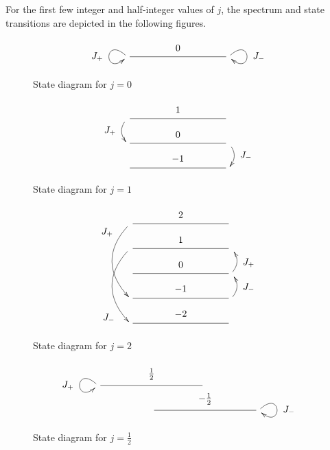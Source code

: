 For the first few integer and half-integer values of $j$, the spectrum
and state transitions are depicted in the following figures.
\begin{figure}[!h]
  \[
  \xymatrix@R=20pt@C=100pt{
    \ar@(ul,dl)[]_*+{J_+} \ar@{-}[r]^-*+{0} & \ar@(ur,dr)[]^*+{J_-}
  }
  \]
  \caption{State diagram for $j=0$}
  \label{J0Diagram}
\end{figure}
\begin{figure}[!h]
  \[
  \xymatrix@R=20pt@C=100pt{
    \ar@/_/[d]_*+{J_+} \ar@{-}[r]^-*+{1} & \\
    \ar@{-}[r]^-*+{0} & \ar@/^/[d]^*+{J_-} \\
    \ar@{-}[r]^-*+{-1} &  \\
  }
  \]
  \caption{State diagram for $j=1$}
  \label{J1Diagram}
\end{figure}
\begin{figure}[!h]
  \[
  \xymatrix@R=20pt@C=100pt{
    \ar@(dl,ul)[ddd]_<<<<<*+{J_+} \ar@{-}[r]^-*+{2} & \\
    \ar@(dl,ul)[ddd]_>>>>>*+{J_-} \ar@{-}[r]^-*+{1} & \\
    \ar@{-}[r]^-*+{0} & \ar@/_/[u]_-*+{J_+} \\
    \ar@{-}[r]^-*+{-1} & \ar@/_/[u]_-*+{J_-} \\
    \ar@{-}[r]^-*+{-2} &
  }
  \]
  \caption{State diagram for $j=2$}
  \label{J2Diagram}
\end{figure}
\pagebreak
\begin{figure}[!h]
  \[
  \xymatrix@R=20pt@C=50pt{
    \ar@(ul,dl)[]_*+{J_+} \ar@{-}[rr]^-*+{\frac12} & & \\
                                                  & \ar@{-}[rr]^-*+{-\frac12} & & \ar@(ur,dr)[]^*+{J_-} \\
  }
  \]
  \caption{State diagram for $j=\frac12$}
  \label{J1/2Diagram}
\end{figure}
